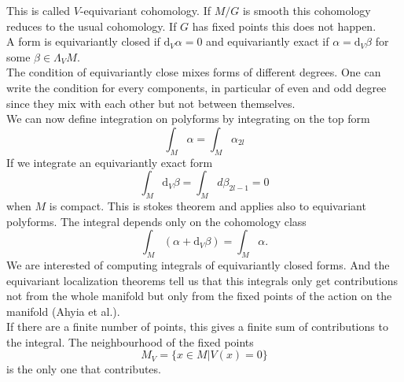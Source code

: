 \documentclass[11pt]{article}
\theoremstyle{definition}
\numberwithin{equation}{section}
\newcommand{\ddv}{\mathrm{d}_V}
\begin{document}
This is called $V$-equivariant cohomology. If $M/G$ is smooth this cohomology reduces to the usual cohomology. If $G$ has fixed points this does not happen.\\
A form is equivariantly closed if $\ddv\alpha=0$ and equivariantly exact if $\alpha=\ddv\beta$ for some $\beta\in\Lambda_{V}M$.\\
The condition of equivariantly close mixes forms of different degrees. One can write the condition for every components, in particular of even and odd degree since they mix with each other but not between themselves.\\

We can now define integration on polyforms by integrating on the top form
\begin{equation}
	\int_{M}\alpha = \int_{M}\alpha_{2l}
\end{equation}
If we integrate an equivariantly exact form
\begin{equation}
	\int_{M}\ddv\beta = \int_{M}d\beta_{2l-1}=0
\end{equation}
when $M$ is compact. This is stokes theorem and applies also to equivariant polyforms. The integral depends only on the cohomology class
\begin{equation}
	\int_{M}(\alpha+\ddv\beta) = \int_{M}\alpha.
\end{equation}
We are interested of computing integrals of equivariantly closed forms. And the equivariant localization theorems tell us that this integrals only get contributions not from the whole manifold but only from the fixed points of the action on the manifold (Ahyia et al.).\\
If there are a finite number of points, this gives a finite sum of contributions to the integral. The neighbourhood of the fixed points
\begin{equation}
	M_{V}=\{ x\in M | V(x)=0\}
\end{equation}
is the only one that contributes.\\
\end{document}
